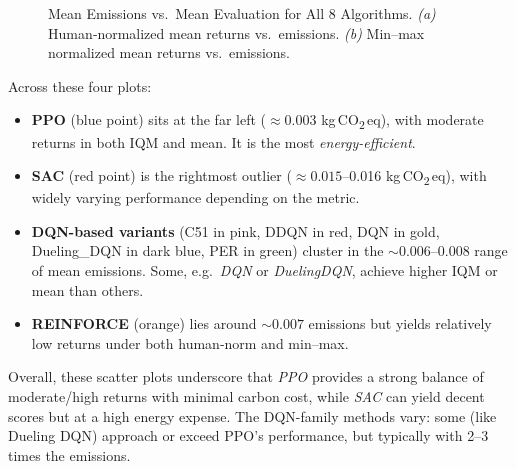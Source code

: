 \begin{figure} 
	\centering
	\quad
	\caption{Mean Emissions vs.\ Mean Evaluation for All 8 Algorithms.
		\textit{(a)} Human‐normalized mean returns vs.\ emissions. 
		\textit{(b)} Min--max normalized mean returns vs.\ emissions.}
	\label{fig:scatter_all_mean}
\end{figure}

Across these four plots:
\begin{itemize}
	\item \textbf{PPO} (blue point) sits at the far left (\(\approx 0.003\) kg\,CO\textsubscript{2}\,eq), 
	with moderate returns in both IQM and mean. It is the most \emph{energy-efficient}.
	\item \textbf{SAC} (red point) is the rightmost outlier (\(\approx 0.015\)–0.016 kg\,CO\textsubscript{2}\,eq), 
	with widely varying performance depending on the metric. 
	\item \textbf{DQN-based variants} (C51 in pink, DDQN in red, DQN in gold,
	Dueling\_DQN in dark blue, PER in green) cluster in the \(\sim0.006\)--0.008 range
	of mean emissions. Some, e.g.\ \emph{DQN} or \emph{DuelingDQN}, achieve higher 
	IQM or mean than others.
	\item \textbf{REINFORCE} (orange) lies around \(\sim0.007\) emissions but yields 
	relatively low returns under both human‐norm and min–max.
\end{itemize}
Overall, these scatter plots underscore that \textit{PPO} provides a strong balance of 
moderate/high returns with minimal carbon cost, while \textit{SAC} can yield decent 
scores but at a high energy expense. The DQN-family methods vary: some (like 
Dueling DQN) approach or exceed PPO's performance, but typically with 2--3 times the emissions.

